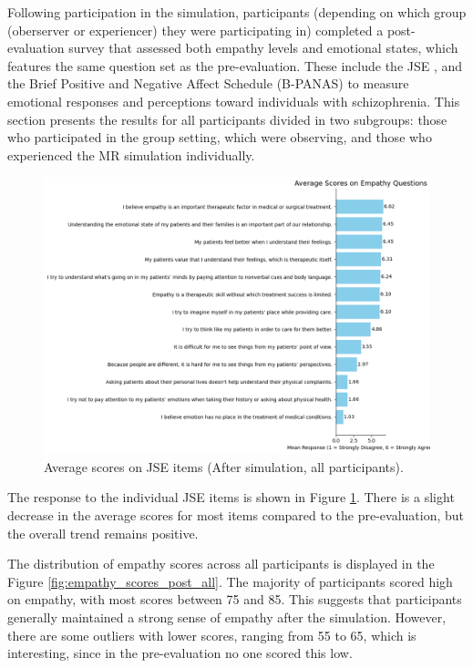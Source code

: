 Following participation in the simulation, participants (depending on which group (oberserver or experiencer) they were participating in) completed a post-evaluation survey that assessed both empathy levels and emotional states, which features the same question set as the pre-evaluation. These include the JSE \cite{Hojat2002}, and the Brief Positive and Negative Affect Schedule (B-PANAS) \cite{Boiroux2024} to measure emotional responses and perceptions toward individuals with schizophrenia. This section presents the results for all participants divided in two subgroups: those who participated in the group setting, which were observing, and those who experienced the MR simulation individually.

\vspace{1em}

\begin{figure}[htbp]
\centering
\includegraphics[width=\columnwidth]{../../Figures/avg_scores_post_all.png}
\caption{Average scores on JSE items (After simulation, all participants).}
\label{fig:avg_scores_post_all}
\end{figure}

 The response to the individual JSE items is shown in Figure \ref{fig:avg_scores_post_all}. There is a slight decrease in the average scores for most items compared to the pre-evaluation, but the overall trend remains positive. 

\vspace{1em}

The distribution of empathy scores across all participants is displayed in the Figure \ref{fig:empathy_scores_post_all}. The majority of participants scored high on empathy, with most scores between 75 and 85. This suggests that participants generally maintained a strong sense of empathy after the simulation. However, there are some outliers with lower scores, ranging from 55 to 65, which is interesting, since in the pre-evaluation no one scored this low.

